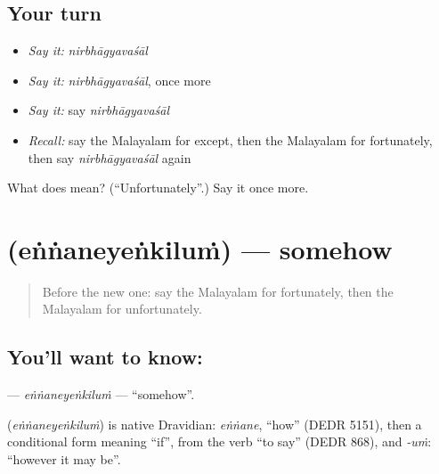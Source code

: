 \subsection*{Your turn}
\begin{itemize}
\raggedright
  \item \emph{Say it:} \emph{nirbhāgyavaśāl}
  \item \emph{Say it:} \emph{nirbhāgyavaśāl}, once more
  \item \emph{Say it:} say \emph{nirbhāgyavaśāl}
  \item \emph{Recall:} say the Malayalam for except, then the Malayalam for fortunately, then say \emph{nirbhāgyavaśāl} again
\end{itemize}

\begin{tcolorbox}[breakable,colback=teal!4,colframe=teal!35!black,title={Before you move on}]
What does  mean? (\textquotedblleft{}Unfortunately\textquotedblright{}.) Say it once more.
\end{tcolorbox}
\section[\texorpdfstring{\ml{എങ്ങനെയെങ്കിലും} (eṅṅaneyeṅkiluṁ)}{എങ്ങനെയെങ്കിലും (eṅṅaneyeṅkiluṁ)}]{ (eṅṅaneyeṅkiluṁ) — somehow}

\label{lesson:ML-C201-ennaneyenkilum}



\begin{quote}
Before the new one: say the Malayalam for fortunately, then the Malayalam for unfortunately.
\end{quote}

\subsection*{You'll want to know: }
\textbf{} — \emph{eṅṅaneyeṅkiluṁ} — \textquotedblleft{}somehow\textquotedblright{}.

\begin{cousinweb}
\textbf{} (\emph{eṅṅaneyeṅkiluṁ}) is native Dravidian: \emph{eṅṅane}, \textquotedblleft{}how\textquotedblright{} (DEDR 5151), then a conditional form meaning \textquotedblleft{}if\textquotedblright{}, from the verb \textquotedblleft{}to say\textquotedblright{} (DEDR 868), and \emph{-uṁ}: \textquotedblleft{}however it may be\textquotedblright{}.
\end{cousinweb}

